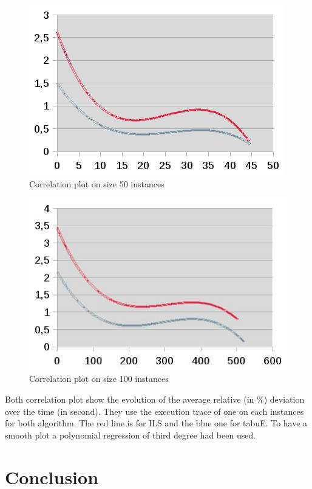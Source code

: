 \documentclass[12pt,a4paper]{article}
\begin{document}
\begin{figure}[!h]
\centering
\includegraphics[scale=0.7]{corelation_plot_50.jpg}
\caption{Correlation plot on size 50 instances}
\label{Correlation plot on size 50 instances}
\end{figure}

\begin{figure}[!h]
\centering
\includegraphics[scale=0.7]{corelation_plot_100.jpg}
\caption{Correlation plot on size 100 instances}
\label{Correlation plot on size 100 instances}
\end{figure}

Both correlation plot show the evolution of the average relative (in $\%$) deviation over the time (in second). They use the execution trace of one on each instances for both algorithm. The red line is for ILS and the blue one for tabuE. To have a smooth plot a polynomial regression of third degree had been used.

\section*{Conclusion}




\end{document}
